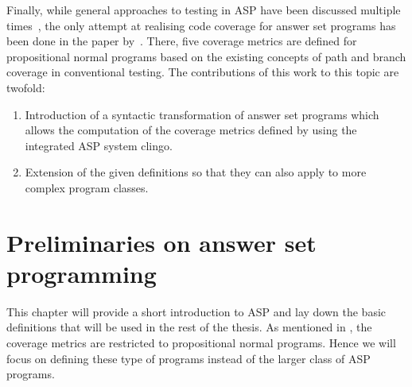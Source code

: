 Finally, while general approaches to testing in ASP have been discussed multiple times~\cite[examples:][]{GOT17, ABR21, Oet22}, the only attempt at realising code coverage for answer set programs has been done in the paper  by~\textcite{Jan+10}. 
There, five coverage metrics are defined for propositional normal programs based on the existing concepts of path and branch coverage in conventional testing. The contributions of this work to this topic are twofold:
\begin{enumerate}
    \item Introduction of a syntactic transformation of answer set programs which allows the computation of the coverage metrics defined by \citeauthor{Jan+10} using the integrated ASP system clingo.
    \item Extension of the given definitions so that they can also apply to more complex program classes.
\end{enumerate}

\chapter{Preliminaries on answer set programming}
\label{ch:Preliminaries on answer set programming}
This chapter will provide a short introduction to ASP and lay down the basic definitions that will be used in the rest of the thesis. As mentioned in , the coverage metrics are restricted to propositional normal programs. Hence we will focus on defining these type of programs instead of the larger class of ASP programs.


